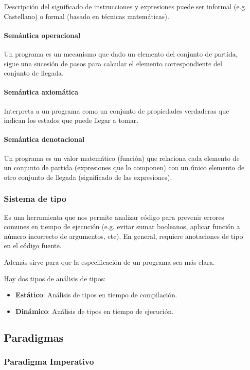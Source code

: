 Descripción del significado de instrucciones y expresiones puede ser informal (e.g. Castellano) o formal (basado en técnicas matemáticas).

\paragraph{Semántica operacional} Un programa es un mecanismo que dado un elemento del conjunto de partida, sigue una sucesión de pasos para calcular el elemento correspondiente del conjunto de llegada.

\paragraph{Semántica axiomática} Interpreta a un programa como un conjunto de propiedades verdaderas que indican los estados que puede llegar a tomar.

\paragraph{Semántica denotacional} Un programa es un valor matemático (función) que relaciona cada elemento de un conjunto de partida (expresiones que lo componen) con un único elemento de otro conjunto de llegada (significado de las expresiones).

\subsubsection{Sistema de tipo}
Es una herramienta que nos permite analizar código para prevenir errores comunes en tiempo de ejecución (e.g. evitar sumar booleanos, aplicar función a número incorrecto de argumentos, etc). En general, requiere anotaciones de tipo en el código fuente. 

Además sirve para que la especificación de un programa sea más clara.

Hay dos tipos de análisis de tipos:
\begin{itemize}
	\item \textbf{Estático}: Análisis de tipos en tiempo de compilación.
	\item \textbf{Dinámico}: Análisis de tipos en tiempo de ejecución.
\end{itemize}

\subsection{Paradigmas}
\subsubsection{Paradigma Imperativo}

